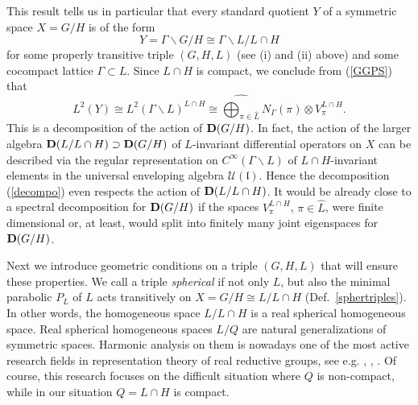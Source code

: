 \documentclass[10]{amsart}
\theoremstyle{remark}
\theoremstyle{definition}
\numberwithin{equation}{section}
\newcommand{\fl}{{\mathfrak l}}
\newcommand{\Cal}{\mathcal}
\begin{document}
This result tells us in particular that every standard quotient $Y$ of a symmetric space $X=G/H$  is of the form
$$   Y=\Gamma\backslash G/H \cong \Gamma\backslash L/L\cap H  $$
for some properly transitive triple $(G,H,L)$ (see (i) and (ii) above)  and some cocompact lattice $\Gamma\subset L$. Since $L\cap H$ is compact, we conclude from (\ref{GGPS}) that
\begin{equation}\label{decompo}  
L^2(Y)\cong L^2(\Gamma\backslash L)^{L\cap H}\cong  \widehat{\bigoplus_{\pi\in\widehat{L}}}N_\Gamma(\pi)\otimes V_\pi^{L\cap H}.
\end{equation}
%
This is a decomposition of the action of ${\bf D}(G/H)$. In fact, the action of the  larger algebra ${\bf D}(L/L\cap H)\supset {\bf D}(G/H)$ of $L$-invariant differential operators on $X$ can be described
via the  regular representation on $C^\infty(\Gamma\backslash L)$ of $L\cap H$-invariant elements in the universal enveloping algebra ${\Cal U}(\fl)$. Hence the decomposition (\ref{decompo}) even respects the action of ${\bf D}(L/L\cap H)$. It would be already close to a spectral decomposition for ${\bf D}(G/H)$ if the spaces  $V_\pi^{L\cap H}$, $\pi\in\widehat L$, were finite dimensional or, at least, would split into finitely many joint eigenspaces for ${\bf D}(G/H)$. 

Next we introduce geometric conditions on a triple $(G,H,L)$ that will ensure these properties.
We call a triple {\em spherical} if not only $L$, but also the minimal parabolic $P_L$ of $L$ acts transitively on $X=G/H\cong L/L\cap H$ (Def.~\ref{sphertriples}). In other words, the homogeneous space $L/L\cap H$
is a real spherical homogeneous space. Real spherical homogeneous spaces $L/Q$ are natural generalizations of symmetric spaces. Harmonic analysis on them is nowadays one of the most active research fields in representation theory of real reductive groups, see e.g. \cite{DKKS}, \cite{SV}, \cite{KKS}. Of course, this research focuses on the difficult situation where $Q$ is non-compact, while in our situation $Q=L\cap H$ is compact. 
\end{document}

